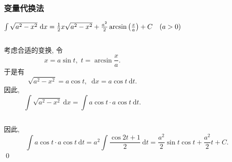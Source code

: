 \documentclass[
10pt,
aspectratio=43,
]{beamer}
\begin{document}
\begin{frame}
	\frametitle{变量代换法}
	\everymath{\displaystyle}
	{\small
		\begin{exampleblock}{$\color{black}\int \sqrt{a^2-x^2} \mathrm{~d} x = \frac{1}{2}x\sqrt{a^2-x^2}+\frac{a^2}{2}\arcsin\left(\frac{x}{a}\right)+C \quad(a>0)$}
			\pause
			\begin{columns}
				\begin{column}{0.4\textwidth}
					考虑合适的变换, 令
					$$
						x=a \sin t,\,\,t=\arcsin\frac{x}{a}.
					$$
					\pause 于是有
					$$
						\sqrt{a^2-x^2} = a\cos t,\,\,\mathrm{~d}x=a\cos t\mathrm{~d}t.
					$$
					\pause 因此,
					$$
						\int \sqrt{a^2-x^2} \mathrm{~d} x=\int a\cos t\cdot a\cos t\mathrm{~d}t.
					$$
				\end{column}
				\begin{column}{0.5\textwidth}
					\begin{figure}
						\centering
					\end{figure}
				\end{column}
			\end{columns}
			\pause
			\vspace{0.1cm}
			因此,
			$$
				\int a\cos t\cdot a\cos t\mathrm{~d}t = a^2\int \frac{\cos 2t+1}{2}\mathrm{~d}t=\frac{a^2}{2}\sin t\cos t+\frac{a^2}{2}t+C.
			$$
			\qed
		\end{exampleblock}
	}
\end{frame}
\end{document}
